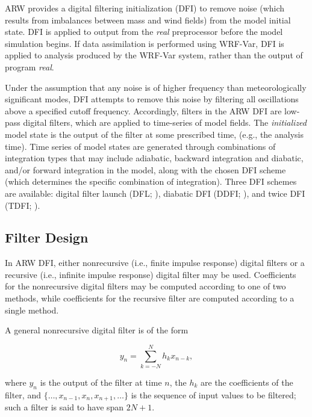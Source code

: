 ARW provides a digital filtering initialization (DFI) to 
remove noise (which results from imbalances between mass and wind fields) 
from the model initial state. DFI is applied to output from the {\it real} 
preprocessor before the model simulation begins. If data assimilation is 
performed using WRF-Var, DFI is applied to analysis produced by the 
WRF-Var system, rather than the output of program {\it real}.

Under the assumption that any noise is of 
higher frequency than meteorologically significant modes, DFI attempts to 
remove this noise by filtering all oscillations above a specified cutoff 
frequency. Accordingly, filters in the ARW DFI are low-pass digital 
filters, which are applied to time-series of model fields. The {\it initialized} 
model state is the output of the filter at some prescribed time, 
(e.g., the analysis time). Time series of model states are generated through 
combinations of integration types that may include adiabatic, backward integration and diabatic, and/or forward 
integration in the model, along with the chosen DFI scheme (which determines the 
specific combination of integration). Three DFI schemes are available: 
digital filter launch (DFL; \cite{lynchhuang94}), diabatic DFI (DDFI; \cite{huanglynch93}), 
and twice DFI (TDFI; \cite{lynchhuang94}).

\subsection{Filter Design}

In ARW DFI, either nonrecursive (i.e., finite impulse response) digital 
filters or a recursive (i.e., infinite impulse response) digital filter may 
be used. Coefficients for the nonrecursive digital filters may be 
computed according to one of two methods, while coefficients for the 
recursive filter are computed according to a single method.

A general nonrecursive digital filter is of the form

\begin{equation}
y_n = \sum_{k=-N}^{N} h_k x_{n-k},
\label{fir_filter}
\end{equation}

\noindent
where $y_n$ is the output of the filter at time $n$, the $h_k$ are the 
coefficients of the filter, and $\{ \ldots , x_{n-1}, x_n, x_{n+1}, \ldots \}$ 
is the sequence of input values to be filtered; such a filter is said to have 
span $2N+1$. 

